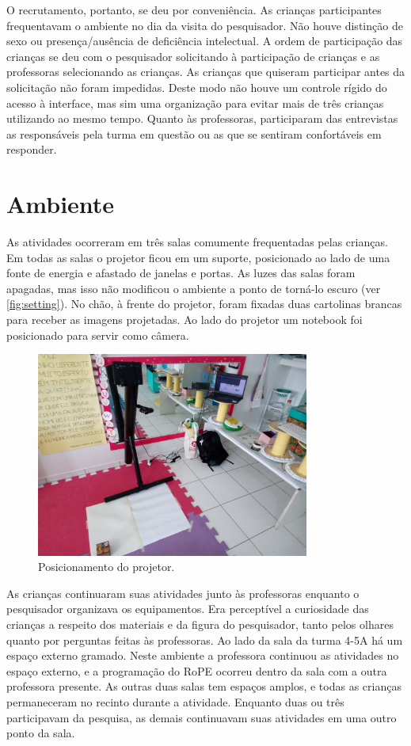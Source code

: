 O recrutamento, portanto, se deu por conveniência. As crianças participantes frequentavam o ambiente no dia da visita do pesquisador. Não houve distinção de sexo ou presença/ausência de deficiência intelectual. A ordem de participação das crianças se deu com o pesquisador solicitando à participação de crianças e as professoras selecionando as crianças. As crianças que quiseram participar antes da solicitação não foram impedidas. Deste modo não houve um controle rígido do acesso à interface, mas sim uma organização para evitar mais de três crianças utilizando ao mesmo tempo. Quanto às professoras, participaram das entrevistas as responsáveis pela turma em questão ou as que se sentiram confortáveis em responder.

\section{Ambiente}
As atividades ocorreram em três salas comumente frequentadas pelas crianças. Em todas as salas o projetor ficou em um suporte, posicionado ao lado de uma fonte de energia e afastado de janelas e portas. As luzes das salas foram apagadas, mas isso não modificou o ambiente a ponto de torná-lo escuro (ver \autoref{fig:setting}). No chão, à frente do projetor, foram fixadas duas cartolinas brancas para receber as imagens projetadas. Ao lado do projetor um notebook foi posicionado para servir como câmera. 

\begin{figure}[!h]
    \centering
    \includegraphics[width=0.8\textwidth,fbox]{figs/setting_projector.jpg}
    \caption{Posicionamento do projetor.}
    \label{fig:setting}
\end{figure}

As crianças continuaram suas atividades junto às professoras enquanto o pesquisador organizava os equipamentos. Era perceptível a curiosidade das crianças a respeito dos materiais e da figura do pesquisador, tanto pelos olhares quanto por perguntas feitas às professoras. Ao lado da sala da turma 4-5A há um espaço externo gramado. Neste ambiente a professora continuou as atividades no espaço externo, e a programação do RoPE ocorreu dentro da sala com a outra professora presente. As outras duas salas tem espaços amplos, e todas as crianças permaneceram no recinto durante a atividade. Enquanto duas ou três participavam da pesquisa, as demais continuavam suas atividades em uma outro ponto da sala.

